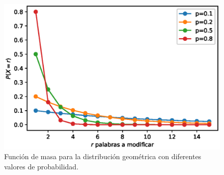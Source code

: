 \begin{figure}[h]
    \includegraphics[width=\textwidth]{sections/figures/geometric_pmf.eps}
    \caption{Función de masa para la distribución geométrica con diferentes valores de probabilidad.}
    \label{fig:geom}
\end{figure}
